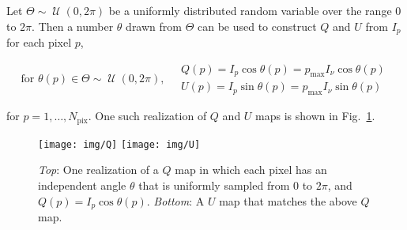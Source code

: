 \documentclass[twoside,10pt]{article}
\DeclareMathOperator{\Uniform}{\mathcal{U}}
\begin{document}
Let $\Theta \sim \Uniform{(0, 2\pi)}$ be a uniformly distributed random
variable over the range 0 to $2\pi$. Then a number $\theta$ drawn from
$\Theta$ can be used to construct $Q$ and $U$ from $I_p$ for each pixel $p$,

\begin{equation}
    \text{for } \theta(p) \in \Theta \sim \Uniform{(0, 2\pi)}, \quad
    \begin{array}{l}
        Q(p) = I_p \cos{\theta(p)} = p_\mathrm{max} I_\nu \cos{\theta(p)}\\
        U(p) = I_p \sin{\theta(p)} = p_\mathrm{max} I_\nu \sin{\theta(p)}
    \end{array}
\end{equation}

for $p = 1, \dots, N_\mathrm{pix}$. One such realization of $Q$ and $U$ maps
is shown in Fig.~\ref{fig:QU}.

\begin{figure}[th]
    \begin{center}
        \texttt{[image: img/Q]}
        \texttt{[image: img/U]}
    \end{center}
    \caption{\emph{Top}: One realization of a $Q$ map in which each pixel has
    an independent angle $\theta$ that is uniformly sampled from 0 to $2\pi$,
    and $Q(p) = I_p \cos{\theta(p)}$. \emph{Bottom}: A $U$ map that matches
    the above $Q$ map.}
    \label{fig:QU}
\end{figure}



\end{document}
